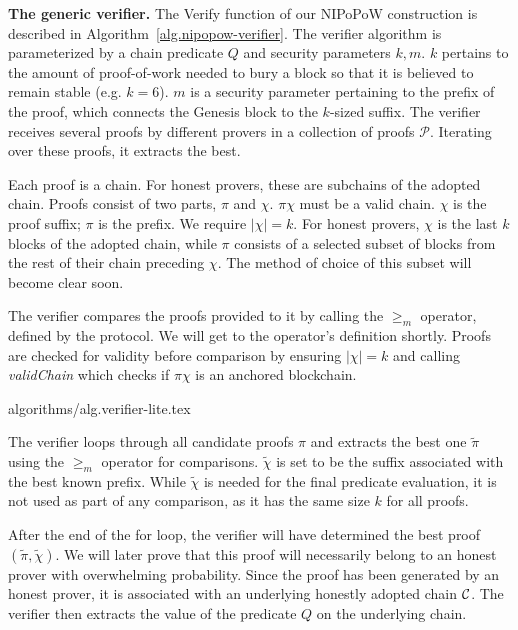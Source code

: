 \noindent
\textbf{The generic verifier.}
The \textsf{Verify} function of our NIPoPoW construction is described in
Algorithm~\ref{alg.nipopow-verifier}. The verifier algorithm is parameterized by
a chain predicate $Q$ and security parameters $k, m$. $k$
pertains to the amount of proof-of-work needed to bury a block so that it is
believed to remain stable (e.g. $k = 6$). $m$ is a security
parameter pertaining to the prefix of the proof, which connects the Genesis
block to the $k$-sized suffix. The verifier receives several proofs by
different provers in a collection of proofs $\mathcal{P}$. Iterating over these
proofs, it extracts the best.

Each proof is a chain. For honest provers, these are subchains of the  adopted
chain. Proofs consist of two parts, $\pi$ and $\chi$. $\pi \chi$ must be a valid
chain. $\chi$ is the proof suffix; $\pi$ is the prefix. We require $|\chi| = k$.
For honest provers, $\chi$ is the last $k$ blocks of the adopted chain, while
$\pi$ consists of a selected subset of blocks from the rest of their chain
preceding $\chi$. The method of choice of this subset will become clear soon.

The verifier compares the proofs provided to it by calling the $\geq_m$
operator, defined by the protocol. We will get to the operator's definition
shortly. Proofs are checked for validity before comparison by ensuring $|\chi| =
k$ and calling \textit{validChain} which checks if $\pi\chi$ is an anchored
blockchain.

{algorithms/alg.verifier-lite.tex}

The verifier loops through all candidate proofs $\pi$ and extracts the best one
$\tilde\pi$ using the $\geq_m$ operator for comparisons. $\tilde\chi$ is set to
be the suffix associated with the best known prefix. While $\tilde\chi$ is
needed for the final predicate evaluation, it is not used as part of any
comparison, as it has the same size $k$ for all proofs.

After the end of the for loop, the verifier will have determined the best proof
$(\tilde\pi, \tilde\chi)$. We will later prove that this proof will necessarily
belong to an honest prover with overwhelming probability. Since the proof has
been generated by an honest prover, it is associated with an underlying honestly
adopted chain $\mathcal{C}$. The verifier then extracts the value of the predicate
$Q$ on the underlying chain.

